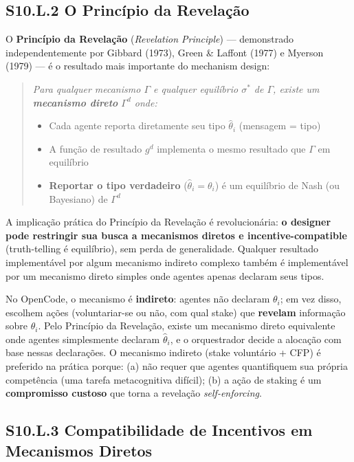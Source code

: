 \subsection*{S10.L.2 O Princípio da Revelação}

O \textbf{Princípio da Revelação} (\textit{Revelation Principle}) --- demonstrado independentemente por Gibbard (1973), Green \& Laffont (1977) e Myerson (1979) --- é o resultado mais importante do mechanism design:

\begin{quote}
\textit{Para qualquer mecanismo $\Gamma$ e qualquer equilíbrio $\sigma^*$ de $\Gamma$, existe um \textbf{mecanismo direto} $\Gamma^d$ onde:}
\begin{itemize}
    \item Cada agente reporta diretamente seu tipo $\hat{\theta}_i$ (mensagem = tipo)
    \item A função de resultado $g^d$ implementa o mesmo resultado que $\Gamma$ em equilíbrio
    \item \textbf{Reportar o tipo verdadeiro} ($\hat{\theta}_i = \theta_i$) é um equilíbrio de Nash (ou Bayesiano) de $\Gamma^d$
\end{itemize}
\end{quote}

A implicação prática do Princípio da Revelação é revolucionária: \textbf{o designer pode restringir sua busca a mecanismos diretos e incentive-compatible} (truth-telling é equilíbrio), sem perda de generalidade. Qualquer resultado implementável por algum mecanismo indireto complexo também é implementável por um mecanismo direto simples onde agentes apenas declaram seus tipos.

No OpenCode, o mecanismo é \textbf{indireto}: agentes não declaram $\theta_i$; em vez disso, escolhem ações (voluntariar-se ou não, com qual stake) que \textbf{revelam} informação sobre $\theta_i$. Pelo Princípio da Revelação, existe um mecanismo direto equivalente onde agentes simplesmente declaram $\hat{\theta}_i$, e o orquestrador decide a alocação com base nessas declarações. O mecanismo indireto (stake voluntário + CFP) é preferido na prática porque: (a) não requer que agentes quantifiquem sua própria competência (uma tarefa metacognitiva difícil); (b) a ação de staking é um \textbf{compromisso custoso} que torna a revelação \textit{self-enforcing}.

\subsection*{S10.L.3 Compatibilidade de Incentivos em Mecanismos Diretos}

